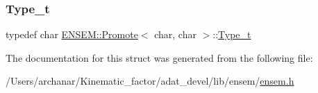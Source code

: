 \subsubsection{\texorpdfstring{Type\_t}{Type\_t}\hspace{0.1cm}{\footnotesize\ttfamily [2/2]}}
{\footnotesize\ttfamily typedef char \mbox{\hyperlink{structENSEM_1_1Promote}{E\+N\+S\+E\+M\+::\+Promote}}$<$ char, char $>$\+::\mbox{\hyperlink{structENSEM_1_1Promote_3_01char_00_01char_01_4_a3353ceefb3e26f60983a352e42d691ed}{Type\+\_\+t}}}



The documentation for this struct was generated from the following file\+:\begin{DoxyCompactItemize}
\item 
/\+Users/archanar/\+Kinematic\+\_\+factor/adat\+\_\+devel/lib/ensem/\mbox{\hyperlink{lib_2ensem_2ensem_8h}{ensem.\+h}}\end{DoxyCompactItemize}
